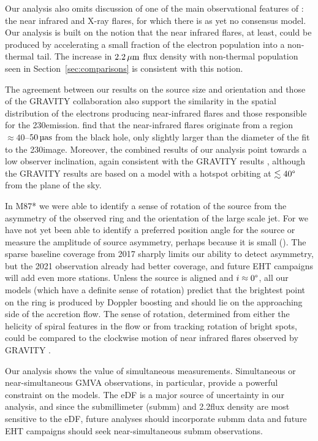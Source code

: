 Our analysis also omits discussion of one of the main observational features of \sgra: the near infrared and X-ray flares, for which there is as yet no consensus model.
Our analysis is built on the notion that the near infrared flares, at least, could be produced by accelerating a small fraction of the electron population into a non-thermal tail.
The increase in $2.2\,\mu\mathrm{m}$ flux density with non-thermal population seen in Section~\ref{sec:comparisons} is consistent with this notion.

The agreement between our results on the source size and orientation and those of the GRAVITY collaboration \citep{2018A&A...618L..10G} also support the similarity in the spatial distribution of the electrons producing near-infrared flares and those responsible for the 230\GHz emission.
\citealt{2018A&A...618L..10G} find that the near-infrared flares originate from a region $\approx 40$--$50\uas$ from the black hole, only slightly larger than the diameter of the \mring fit to the 230\GHz image.
Moreover, the combined results of our analysis point towards a low observer inclination, again consistent with the GRAVITY results , although the GRAVITY results are based on a model with a hotspot orbiting at $\lesssim 40\degree$ from the plane of the sky.

In M87* we were able to identify a sense of rotation of the source from the asymmetry of the observed ring and the orientation of the large scale jet.
For \sgra we have not yet been able to identify a preferred position angle for the source or measure the amplitude of source asymmetry, perhaps because it is small ().
The sparse baseline coverage from 2017 sharply limits our ability to detect asymmetry, but the 2021 observation already had better coverage, and future EHT campaigns will add even more stations.
Unless the source is aligned and $i \approx 0\degree$, all our models (which have a definite sense of rotation) predict that the brightest point on the ring is produced by Doppler boosting and should lie on the approaching side of the accretion flow.  The sense of rotation, determined from either the helicity of spiral features in the flow or from tracking rotation of bright spots, could be compared to the clockwise motion of near infrared flares observed by GRAVITY \citep{2018A&A...618L..10G}.

Our analysis shows the value of simultaneous measurements.
Simultaneous or near-simultaneous GMVA observations, in particular, provide a powerful constraint on the models.
The eDF is a major source of uncertainty in our analysis, and since the submillimeter (submm) and 2.2\um flux density are most sensitive to the eDF, future analyses should incorporate submm data and future EHT campaigns should seek near-simultaneous submm observations.

